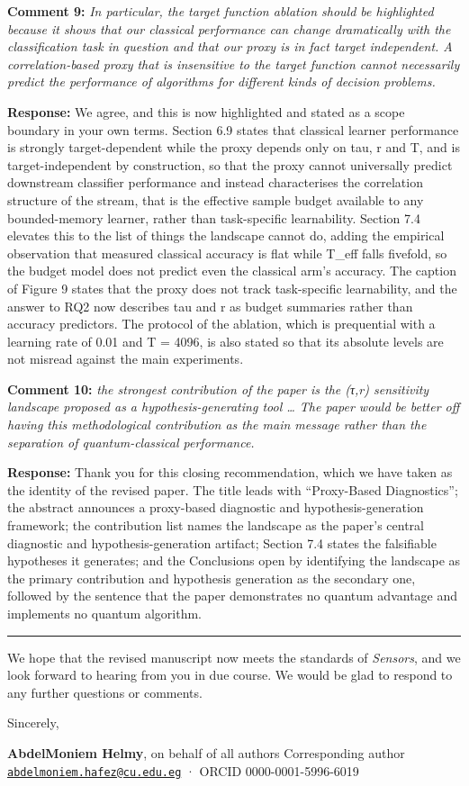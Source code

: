 \documentclass[
  11pt,
]{article}
\begin{document}
\textbf{Comment 9:} \emph{In particular, the target function ablation
should be highlighted because it shows that our classical performance
can change dramatically with the classification task in question and
that our proxy is in fact target independent. A correlation-based proxy
that is insensitive to the target function cannot necessarily predict
the performance of algorithms for different kinds of decision problems.}

\textbf{Response:} We agree, and this is now highlighted and stated as a
scope boundary in your own terms. Section 6.9 states that classical
learner performance is strongly target-dependent while the proxy depends
only on tau, r and T, and is target-independent by construction, so that
the proxy cannot universally predict downstream classifier performance
and instead characterises the correlation structure of the stream, that
is the effective sample budget available to any bounded-memory learner,
rather than task-specific learnability. Section 7.4 elevates this to the
list of things the landscape cannot do, adding the empirical observation
that measured classical accuracy is flat while T\_eff falls fivefold, so
the budget model does not predict even the classical arm's accuracy. The
caption of Figure 9 states that the proxy does not track task-specific
learnability, and the answer to RQ2 now describes tau and r as budget
summaries rather than accuracy predictors. The protocol of the ablation,
which is prequential with a learning rate of 0.01 and T = 4096, is also
stated so that its absolute levels are not misread against the main
experiments.

\textbf{Comment 10:} \emph{the strongest contribution of the paper is
the (τ,r) sensitivity landscape proposed as a hypothesis-generating tool
\ldots{} The paper would be better off having this methodological
contribution as the main message rather than the separation of
quantum-classical performance.}

\textbf{Response:} Thank you for this closing recommendation, which we
have taken as the identity of the revised paper. The title leads with
``Proxy-Based Diagnostics''; the abstract announces a proxy-based
diagnostic and hypothesis-generation framework; the contribution list
names the landscape as the paper's central diagnostic and
hypothesis-generation artifact; Section 7.4 states the falsifiable
hypotheses it generates; and the Conclusions open by identifying the
landscape as the primary contribution and hypothesis generation as the
secondary one, followed by the sentence that the paper demonstrates no
quantum advantage and implements no quantum algorithm.

\begin{center}\rule{0.5\linewidth}{0.5pt}\end{center}

We hope that the revised manuscript now meets the standards of
\emph{Sensors}, and we look forward to hearing from you in due course.
We would be glad to respond to any further questions or comments.

Sincerely,

\textbf{AbdelMoniem Helmy}, on behalf of all authors Corresponding
author
\href{mailto:abdelmoniem.hafez@cu.edu.eg}{\nolinkurl{abdelmoniem.hafez@cu.edu.eg}}
· ORCID 0000-0001-5996-6019
\end{document}
